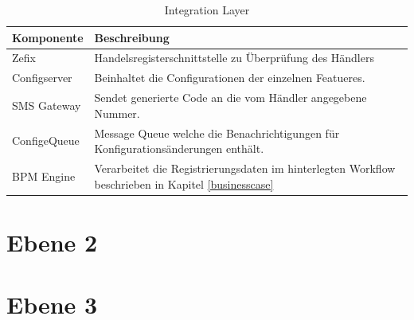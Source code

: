 \begin{table}[H]
	\centering
	\caption{Integration Layer}
	\begin{tabular}{ | p{4cm} | p{12cm} | }
		\toprule
		{\textbf{Komponente}} & {\textbf{Beschreibung}} \\
		\midrule
		Zefix &  Handelsregisterschnittstelle zu Überprüfung des Händlers \\ \hline
		Configserver &  Beinhaltet die Configurationen der einzelnen Featueres. \\ \hline
		SMS Gateway &  Sendet generierte Code an die vom Händler angegebene Nummer. \\ \hline
		ConfigeQueue & Message Queue welche die Benachrichtigungen für Konfigurationsänderungen enthält. \\ \hline
		BPM Engine & Verarbeitet die Registrierungsdaten im hinterlegten Workflow beschrieben in Kapitel \ref{businesscase}\\
		\bottomrule
	\end{tabular}
\end{table}

\section{Ebene 2}

\section{Ebene 3}